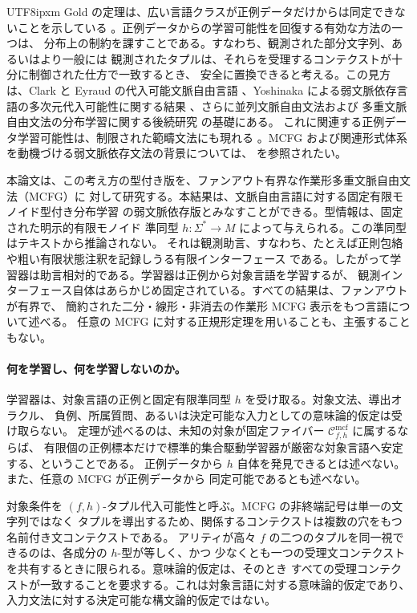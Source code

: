 \documentclass[10pt,a4paper]{article}
\theoremstyle{remark}
\newcommand{\Cmcf}[2]{\mathcal{C}^{\mathrm{mcf}}_{#1,#2}}
\begin{document}
\begin{CJK}{UTF8}{ipxm}
Gold の定理は、広い言語クラスが正例データだけからは同定できないことを示している
\cite{Gold1967}。正例データからの学習可能性を回復する有効な方法の一つは、
分布上の制約を課すことである。すなわち、観測された部分文字列、あるいはより一般には
観測されたタプルは、それらを受理するコンテクストが十分に制御された仕方で一致するとき、
安全に置換できると考える。この見方は、Clark と Eyraud の代入可能文脈自由言語
\cite{ClarkEyraud2007}、Yoshinaka による弱文脈依存言語の多次元代入可能性に関する結果
\cite{Yoshinaka2008,Yoshinaka2009,Yoshinaka2011}、さらに並列文脈自由文法および
多重文脈自由文法の分布学習に関する後続研究
\cite{ClarkYoshinaka2014,ClarkYoshinaka2016} の基礎にある。
これに関連する正例データ学習可能性は、制限された範疇文法にも現れる
\cite{Kanazawa1998}。MCFG および関連形式体系を動機づける弱文脈依存文法の背景については、
\cite{Shieber1985,VijayShankerWeirJoshi1987,Weir1988,Kallmeyer2010} を参照されたい。

本論文は、この考え方の型付き版を、ファンアウト有界な作業形多重文脈自由文法（MCFG）に
対して研究する。本結果は、文脈自由言語に対する固定有限モノイド型付き分布学習
\cite{kuriyamaCFG} の弱文脈依存版とみなすことができる。型情報は、固定された明示的有限モノイド
準同型 \(h:\Sigma^*\to M\) によって与えられる。この準同型はテキストから推論されない。
それは観測助言、すなわち、たとえば正則包絡や粗い有限状態注釈を記録しうる有限インターフェース
である。したがって学習器は助言相対的である。学習器は正例から対象言語を学習するが、
観測インターフェース自体はあらかじめ固定されている。すべての結果は、ファンアウトが有界で、
簡約された二分・線形・非消去の作業形 MCFG 表示をもつ言語について述べる。
任意の MCFG に対する正規形定理を用いることも、主張することもない。

\paragraph{何を学習し、何を学習しないのか。}
学習器は、対象言語の正例と固定有限準同型 \(h\) を受け取る。対象文法、導出オラクル、
負例、所属質問、あるいは決定可能な入力としての意味論的仮定は受け取らない。
定理が述べるのは、未知の対象が固定ファイバー \(\Cmcf{f}{h}\) に属するならば、
有限個の正例標本だけで標準的集合駆動学習器が厳密な対象言語へ安定する、ということである。
正例データから \(h\) 自体を発見できるとは述べない。また、任意の MCFG が正例データから
同定可能であるとも述べない。

対象条件を \((f,h)\)-タプル代入可能性と呼ぶ。MCFG の非終端記号は単一の文字列ではなく
タプルを導出するため、関係するコンテクストは複数の穴をもつ名前付き文コンテクストである。
アリティが高々 \(f\) の二つのタプルを同一視できるのは、各成分の \(h\)-型が等しく、かつ
少なくとも一つの受理文コンテクストを共有するときに限られる。意味論的仮定は、そのとき
すべての受理コンテクストが一致することを要求する。これは対象言語に対する意味論的仮定であり、
入力文法に対する決定可能な構文論的仮定ではない。


\end{CJK}
\end{document}
